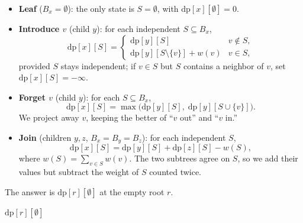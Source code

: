 \begin{itemize}
  \item \textbf{Leaf} ($B_x=\emptyset$): the only state is $S=\emptyset$, with
        $\mathrm{dp}[x][\emptyset]=0$.
  \item \textbf{Introduce $v$} (child $y$): for each independent $S\subseteq B_x$,
        \[
          \mathrm{dp}[x][S]=
          \begin{cases}
            \mathrm{dp}[y][S] & v\notin S,\\[2pt]
            \mathrm{dp}[y][S\setminus\{v\}] + w(v) & v\in S,
          \end{cases}
        \]
        provided $S$ stays independent; if $v\in S$ but $S$ contains a neighbor of
        $v$, set $\mathrm{dp}[x][S]=-\infty$.
  \item \textbf{Forget $v$} (child $y$): for each $S\subseteq B_x$,
        \[
          \mathrm{dp}[x][S]=\max\bigl(\mathrm{dp}[y][S],\;
          \mathrm{dp}[y][S\cup\{v\}]\bigr).
        \]
        We project away $v$, keeping the better of ``$v$ out'' and ``$v$ in.''
  \item \textbf{Join} (children $y,z$, $B_x=B_y=B_z$): for each independent $S$,
        \[
          \mathrm{dp}[x][S]=\mathrm{dp}[y][S]+\mathrm{dp}[z][S]-w(S),
        \]
        where $w(S)=\sum_{v\in S} w(v)$. The two subtrees agree on $S$, so we add
        their values but subtract the weight of $S$ counted twice.
\end{itemize}

The answer is $\mathrm{dp}[r][\emptyset]$ at the empty root $r$.

\begin{algorithm}[H]
\caption{\textsc{MWIS} on a nice tree decomposition}
\label{ch24:alg-mwis}
\Return $\mathrm{dp}[r][\emptyset]$\;
\end{algorithm}

